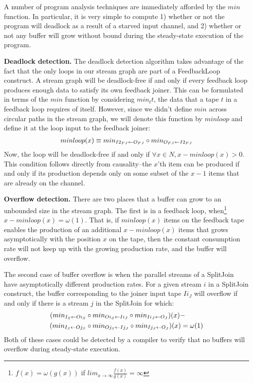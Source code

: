 A number of program analysis techniques are immediately afforded by
the $min$ function.  In particular, it is very simple to compute 1)
whether or not the program will deadlock as a result of a starved
input channel, and 2) whether or not any buffer will grow without
bound during the steady-state execution of the program.

{\bf Deadlock detection.}  The deadlock detection algorithm takes
advantage of the fact that the only loops in our stream graph are part
of a FeedbackLoop construct.  A stream graph will be deadlock-free if
and only if every feedback loop produces enough data to satisfy its
own feedback joiner.  This can be formulated in terms of the $min$
function by considering $min_{t}{t}$, the data that a tape $t$ in a
feedback loop requires of itself.  However, since we didn't define
$min$ across circular paths in the stream graph, we will denote this
function by $minloop$ and define it at the loop input to the feedback
joiner:
\begin{align*}
minloop(x) \equiv min_{I2_{FJ} \leftarrow O_{FJ}} \circ min_{O_{FJ} \leftarrow I2_{FJ}}
\end{align*}
Now, the loop will be deadlock-free if and only if $\forall x \in N, x
- minloop(x) > 0$.  This condition follows directly from
causality--the $x$'th item can be produced if and only if its
production depends only on some subset of the $x-1$ items that are
already on the channel.

{\bf Overflow detection.}  There are two places that a buffer can grow
to an unbounded size in the stream graph.  The first is in a feedback
loop, when\footnote{$f(x) = \omega(g(x))$ if $lim_{x \rightarrow
\infty}\frac{f(x)}{g(x)} = \infty$}~$x - minloop(x) = \omega(1)$.
That is, if $minloop(x)$ items on the feedback tape enables the
production of an additional $x - minloop(x)$ items that grows
asymptotically with the position $x$ on the tape, then the constant
consumption rate will not keep up with the growing production rate,
and the buffer will overflow.

The second case of buffer overflow is when the parallel streams of a
SplitJoin have asymptotically different production rates.  For a given
stream $i$ in a SplitJoin construct, the buffer corresponding to the
joiner input tape $Ii_J$ will overflow if and only if there is a
stream $j$ in the SplitJoin for which:
\begin{align*}
(min_{I_S \leftarrow Oi_S}& \circ min_{Oi_S \leftarrow Ii_J} \circ min_{Ii_J \leftarrow O_J})(x) - \\
(min_{I_S \leftarrow Oj_S}& \circ min_{Oj_S \leftarrow Ij_J} \circ min_{Ij_J \leftarrow O_J})(x) = \omega(1)
\end{align*}
Both of these cases could be detected by a compiler to verify that no
buffers will overflow during steady-state execution.

